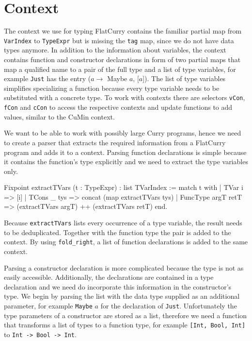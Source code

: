 \documentclass[fleqn]{scrreprt}
\newcommand{\coqinline}[1]{\texttt{#1}}
\begin{document}
\section{Context}
\label{context}
The context we use for typing FlatCurry contains the familiar partial map from \coqinline{VarIndex} to \coqinline{TypeExpr} but is missing the \coqinline{tag} map, since we do not have data types anymore. In addition to the information about variables, the context contains function and constructor declarations in form of two partial maps that map a qualified name to a pair of the full type and a list of type variables, for example \texttt{Just} has the entry ($a \rightarrow$ Maybe $a$, [$a$]). The list of type variables simplifies specializing a function because every type variable needs to be substituted with a concrete type. To work with contexts there are selectors \coqinline{vCon}, \coqinline{fCon} and \coqinline{cCon} to access the respective contexts and update functions to add values, similar to the CuMin context.\\
\par
We want to be able to work with possibly large Curry programs, hence we need to create a parser that extracts the required information from a FlatCurry program and adds it to a context. Parsing function declarations is simple because it contains the function's type explicitly and we need to extract the type variables only.
\begin{coqcode}
Fixpoint extractTVars (t : TypeExpr) : list TVarIndex :=
  match t with
  | TVar i      => [i]
  | TCons _ tys => concat (map extractTVars tys)
  | FuncType argT retT => (extractTVars argT) ++ (extractTVars retT)
  end.
\end{coqcode}
Because \coqinline{extractTVars} lists every occurrence of a type variable, the result needs to be deduplicated. Together with the function type the pair is added to the context. By using \coqinline{fold_right}, a list of function declarations is added to the same context.
\par
Parsing a constructor declaration is more complicated because the type is not as easily accessible. Additionally, the declarations are contained in a type declaration and we need do incorporate this information in the constructor's type. We begin by parsing the list with the data type supplied as an additional parameter, for example \texttt{Maybe} $a$ for the declaration of \texttt{Just}. Unfortunately the type parameters of a constructor are stored as a list, therefore we need a function that transforms a list of types to a function type, for example \texttt{[Int, Bool, Int]} to \texttt{Int -> Bool -> Int}.
\end{document}
